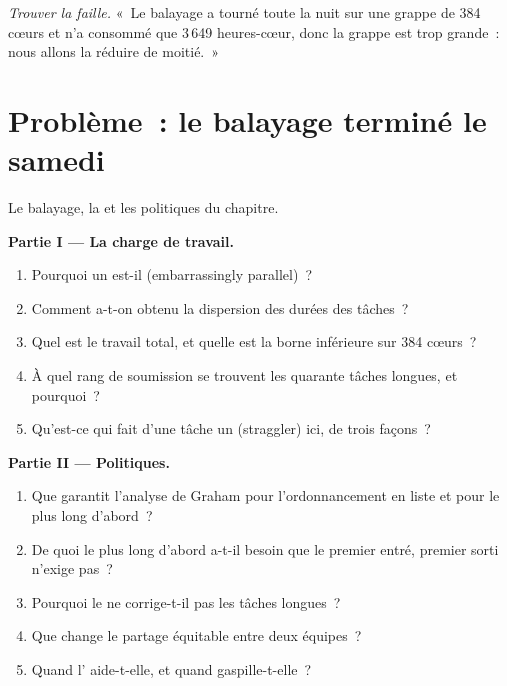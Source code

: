 \begin{exercise}[$\star\star\star$]\label{exo:pl:distributed-compute-and-schedulers:8}
\emph{Trouver la faille.} «~Le balayage a tourné toute la nuit sur une grappe de 384 cœurs et n'a consommé que 3\,649 heures-cœur, donc la grappe est trop grande~: nous
allons la réduire de moitié.~»
\end{exercise}

\section{Problème~: le balayage terminé le samedi}

\begin{problem}\label{pb:pl:distributed-compute-and-schedulers:1}
Le balayage, la  et les politiques du chapitre.

\medskip\noindent\textbf{Partie I --- La charge de travail.}
\begin{enumerate}
\item Pourquoi un  est-il  (embarrassingly parallel)~?
\item Comment a-t-on obtenu la dispersion des durées des tâches~?
\item Quel est le travail total, et quelle est la borne inférieure sur 384 cœurs~?
\item À quel rang de soumission se trouvent les quarante tâches longues, et pourquoi~?
\item Qu'est-ce qui fait d'une tâche un  (straggler) ici, de trois façons~?
\end{enumerate}

\medskip\noindent\textbf{Partie II --- Politiques.}
\begin{enumerate}[resume]
\item Que garantit l'analyse de Graham pour l'ordonnancement en liste et pour le plus long d'abord~?
\item De quoi le plus long d'abord a-t-il besoin que le premier entré, premier sorti n'exige pas~?
\item Pourquoi le  ne corrige-t-il pas les tâches longues~?
\item Que change le partage équitable entre deux équipes~?
\item Quand l' aide-t-elle, et quand gaspille-t-elle~?
\end{enumerate}


\end{problem}
